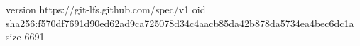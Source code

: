version https://git-lfs.github.com/spec/v1
oid sha256:f570df7691d90ed62ad9ca725078d34c4aacb85da42b878da5734ea4bec6dc1a
size 6691
